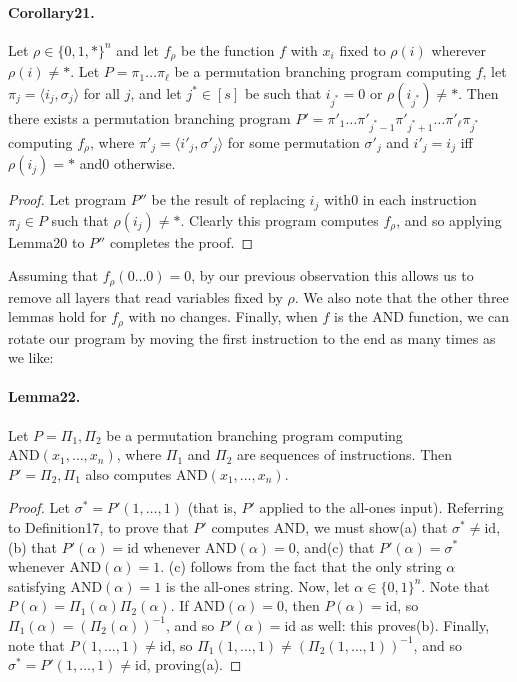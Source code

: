 \paragraph{Corollary21.} Let $\rho\in\{0,1,*\}^n$ and let $f_{\rho}$ be the function $f$ with $x_i$ fixed to $\rho(i)$ wherever $\rho(i)\neq*$. Let $P=\pi_1\ldots\pi_{\ell}$ be a permutation branching program computing $f$, let $\pi_j=\langle i_j,\sigma_j\rangle$ for all $j$, and let $j^*\in[s]$ be such that $i_{j^*}=0$ or $\rho(i_{j^*})\neq*$. Then there exists a permutation branching program $P'=\pi'_1\ldots\pi'_{j^*-1}\pi'_{j^*+1}\ldots\pi'_{\ell}\pi_{j^*}$ computing $f_{\rho}$, where $\pi'_j=\langle i'_j,\sigma'_j\rangle$ for some permutation $\sigma'_j$ and $i'_j=i_j$ iff $\rho(i_j)=*$ and0 otherwise.
\begin{proof}
Let program $P''$ be the result of replacing $i_j$ with0 in each instruction $\pi_j\in P$ such that $\rho(i_j)\neq*$. Clearly this program computes $f_{\rho}$, and so applying Lemma20 to $P''$ completes the proof.
\end{proof}
Assuming that $f_{\rho}(0\ldots0)=0$, by our previous observation this allows us to remove all layers that read variables fixed by $\rho$. We also note that the other three lemmas hold for $f_{\rho}$ with no changes.
Finally, when $f$ is the AND function, we can rotate our program by moving the first instruction to the end as many times as we like:
\paragraph{Lemma22.} Let $P=\Pi_1,\Pi_2$ be a permutation branching program computing $\mathrm{AND}(x_1,\ldots,x_n)$, where $\Pi_1$ and $\Pi_2$ are sequences of instructions. Then $P'=\Pi_2,\Pi_1$ also computes $\mathrm{AND}(x_1,\ldots,x_n)$.
\begin{proof}
Let $\sigma^*=P'(1,\ldots,1)$ (that is, $P'$ applied to the all-ones input). Referring to Definition17, to prove that $P'$ computes AND, we must show(a) that $\sigma^*\neq\mathrm{id}$,(b) that $P'(\alpha)=\mathrm{id}$ whenever $\mathrm{AND}(\alpha)=0$, and(c) that $P'(\alpha)=\sigma^*$ whenever $\mathrm{AND}(\alpha)=1$.
(c) follows from the fact that the only string $\alpha$ satisfying $\mathrm{AND}(\alpha)=1$ is the all-ones string.
Now, let $\alpha\in\{0,1\}^n$. Note that $P(\alpha)=\Pi_1(\alpha)\Pi_2(\alpha)$. If $\mathrm{AND}(\alpha)=0$, then $P(\alpha)=\mathrm{id}$, so $\Pi_1(\alpha)=(\Pi_2(\alpha))^{-1}$, and so $P'(\alpha)=\mathrm{id}$ as well: this proves(b).
Finally, note that $P(1,\ldots,1)\neq\mathrm{id}$, so $\Pi_1(1,\ldots,1)\neq(\Pi_2(1,\ldots,1))^{-1}$, and so $\sigma^*=P'(1,\ldots,1)\neq\mathrm{id}$, proving(a).
\end{proof}
